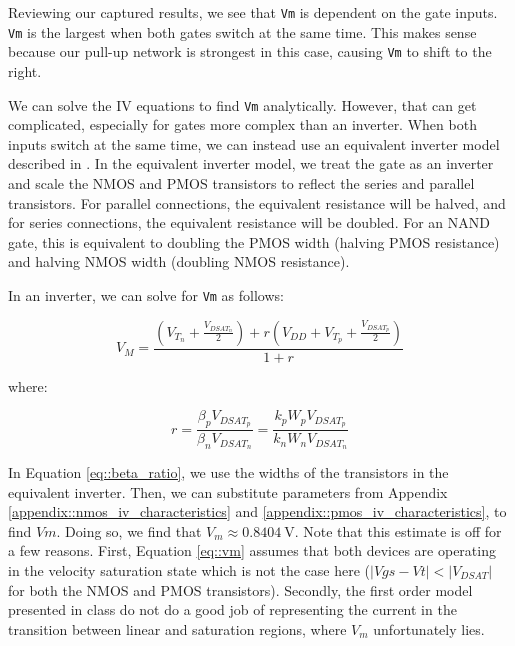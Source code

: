 \documentclass[fleqn]{article}
\begin{document}
	\noindent Reviewing our captured results, we see that \texttt{Vm} is dependent on the gate inputs. \texttt{Vm} is the largest when both gates switch at the same time. This makes sense because our pull-up network is strongest in this case, causing \texttt{Vm} to shift to the right.
	
	We can solve the IV equations to find \texttt{Vm} analytically. However, that can get complicated, especially for gates more complex than an inverter. When both inputs switch at the same time, we can instead use an equivalent inverter model described in \cite{cmos_vlsi_design, equivalent_inverter, inverter_dc_analysis}. In the equivalent inverter model, we treat the gate as an inverter and scale the NMOS and PMOS transistors to reflect the series and parallel transistors. For parallel connections, the equivalent resistance will be halved, and for series connections, the equivalent resistance will be doubled. For an NAND gate, this is equivalent to doubling the PMOS width (halving PMOS resistance) and halving NMOS width (doubling NMOS resistance).
	
	In an inverter, we can solve for \texttt{Vm} as follows:
	
	\begin{equation}
		\label{eq::vm}
		V_{M} = \frac{\left(V_{T_n} + \frac{V_{DSAT_n}}{2}\right) + r\left(V_{DD} + V_{T_p} + \frac{V_{DSAT_p}}{2}\right)}{1 + r}
	\end{equation}
	
	\noindent where:
	
	\begin{equation}
		\label{eq::beta_ratio}
		r = \frac{\beta_pV_{DSAT_p}}{\beta_nV_{DSAT_n}} = \frac{k_pW_pV_{DSAT_p}}{k_nW_nV_{DSAT_n}}
	\end{equation}
	
	\noindent In Equation \ref{eq::beta_ratio}, we use the widths of the transistors in the equivalent inverter. Then, we can substitute parameters from Appendix \ref{appendix::nmos_iv_characteristics} and \ref{appendix::pmos_iv_characteristics}, to find $Vm$. Doing so, we find that $V_m \approx 0.8404\ \text{V}$. Note that this estimate is off for a few reasons. First, Equation \ref{eq::vm} assumes that both devices are operating in the velocity saturation state which is not the case here ($|Vgs - Vt| < |V_{DSAT}|$ for both the NMOS and PMOS transistors). Secondly, the first order model presented in class do not do a good job of representing the current in the transition between linear and saturation regions, where $V_m$ unfortunately lies. 
	
\end{document}
